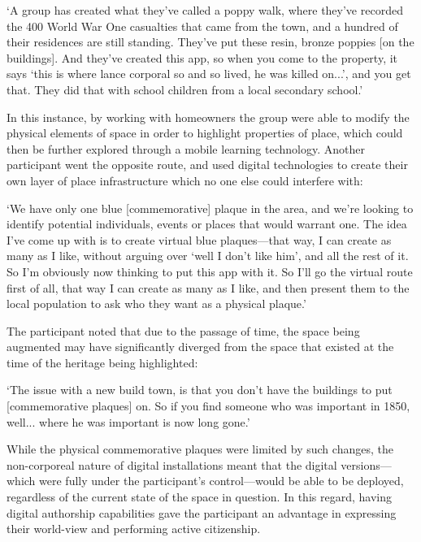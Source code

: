 \begin{displayquote}
`A group has created what they've called a poppy walk, where they've recorded the 400 World War One casualties that came from the town, and a hundred of their residences are still standing. They've put these resin, bronze poppies [on the buildings]. And they've created this app, so when you come to the property, it says `this is where lance corporal so and so lived, he was killed on...', and you get that. They did that with school children from a local secondary school.'
\end{displayquote}

In this instance, by working with homeowners the group were able to modify the physical elements of space in order to highlight properties of place, which could then be further explored through a mobile learning technology. Another participant went the opposite route, and used digital technologies to create their own layer of place infrastructure which no one else could interfere with:

\begin{displayquote}
`We have only one blue [commemorative] plaque in the area, and we're looking to identify potential individuals, events or places that would warrant one. The idea I've come up with is to create virtual blue plaques---that way, I can create as many as I like, without arguing over `well I don't like him', and all the rest of it. So I'm obviously now thinking to put this app with it. So I'll go the virtual route first of all, that way I can create as many as I like, and then present them to the local population to ask who they want as a physical plaque.'
\end{displayquote}

The participant noted that due to the passage of time, the space being augmented may have significantly diverged from the space that existed at the time of the heritage being highlighted:

\begin{displayquote}
`The issue with a new build town, is that you don't have the buildings to put [commemorative plaques] on. So if you find someone who was important in 1850, well... where he was important is now long gone.'
\end{displayquote}

While the physical commemorative plaques were limited by such changes, the non-corporeal nature of digital installations meant that the digital versions---which were fully under the participant's control---would be able to be deployed, regardless of the current state of the space in question. In this regard, having digital authorship capabilities gave the participant an advantage in expressing their world-view and performing active citizenship.

